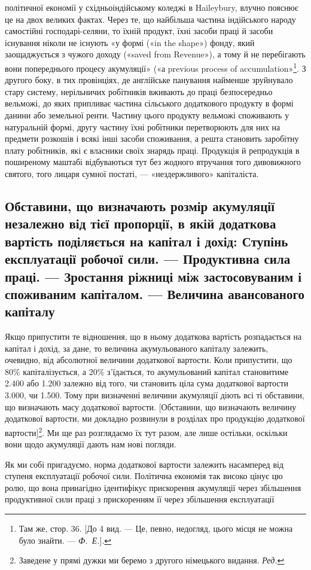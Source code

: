 \parcont{}  %
політичної економії у східньоіндійському коледжі в Haileybury,
влучно пояснює це на двох великих фактах. Через те, що
найбільша частина індійського народу самостійні господарі-селяни,
то їхній продукт, їхні засоби праці й засоби існування
ніколи не існують «у формі («in the shape») фонду, який заощаджується
з чужого доходу («saved from Revenue»), а тому
й не перебігають вони попереднього процесу акумуляції» («а
previous process of accumulation»\footnote{
Там же, стор. 36. [До 4 вид. — Це, певно, недогляд, цього місця
не можна було знайти. — \emph{Ф.~Е.}].
}. З другого боку, в тих провінціях,
де англійське панування найменше зруйнувало стару
систему, нерільничих робітників вживають до праці безпосередньо
вельможі, до яких припливає частина сільського додаткового продукту
в формі данини або земельної ренти. Частину цього продукту
вельможі споживають у натуральній формі, другу частину
їхні робітники перетворюють для них на предмети розкошів
і всякі інші засоби споживання, а решта становить заробітну
плату робітників, які є власники своїх знарядь праці. Продукція
й репродукція в поширеному маштабі відбуваються тут без
жодного втручання того дивовижного святого, того лицаря сумної
постаті, — «нездержливого» капіталіста.

\subsection{Обставини, що визначають розмір акумуляції незалежно від
тієї пропорції, в якій додаткова вартість поділяється на капітал
і дохід: Ступінь експлуатації робочої сили. — Продуктивна
сила праці. — Зростання ріжниці між застосовуваним і споживаним
капіталом. — Величина авансованого капіталу}

Якщо припустити те відношення, що в ньому додаткова вартість
розпадається на капітал і дохід, за дане, то величина акумульованого
капіталу залежить, очевидно, від абсолютної величини
додаткової вартости. Коли припустити, що 80\% капіталізується,
а 20\% з’їдається, то акумульований капітал становитиме
\num{2.400} або \num{1.200} залежно
від того, чи становить ціла сума додаткової вартости \num{3.000}, чи \num{1.500}. Тому при визначенні
величини акумуляції діють всі ті обставини, що визначають масу
додаткової вартости. [Обставини, що визначають величину додаткової
вартости, ми докладно розвинули в розділах про продукцію
додаткової вартости]\footnote*{
Заведене у прямі дужки ми беремо з другого німецького видання.
\emph{Ред.}
}. Ми ще раз розглядаємо їх тут
разом, але лише остільки, оскільки вони щодо акумуляції дають
нам нові погляди.

Як ми собі пригадуємо, норма додаткової вартости залежить
насамперед від ступеня експлуатації робочої сили. Політична
економія так високо цінує цю ролю, що вона принагідно ідентифікує
прискорення акумуляції через збільшення продуктивної
сили праці з прискоренням її через збільшення експлуатації
\parbreak{}  %
